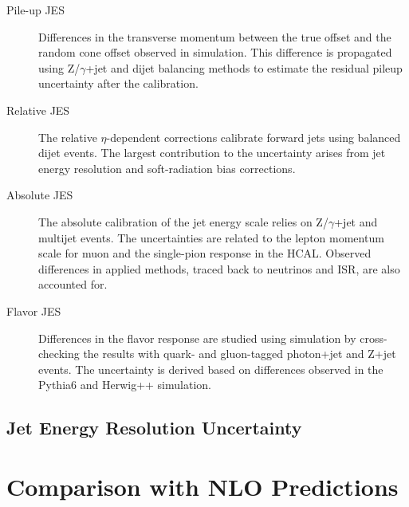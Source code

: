 \begin{description}
    \item[Pile-up JES] Differences in the transverse momentum between the true
        offset and the random cone offset observed in simulation. This
        difference is propagated using Z/$\gamma$+jet and dijet balancing
        methods to estimate the residual pileup uncertainty after the
        calibration.
    \item[Relative JES] The relative $\eta$-dependent corrections calibrate
        forward jets using balanced dijet events. The largest contribution to
        the uncertainty arises from jet energy resolution and soft-radiation
        bias corrections. 
    \item[Absolute JES]  The absolute calibration of the jet energy scale relies
        on Z/$\gamma$+jet and multijet events. The uncertainties are related to
        the lepton momentum scale for muon and the single-pion response in the
        HCAL. Observed differences in applied methods, traced back to neutrinos
        and ISR, are also accounted for. 
    \item[Flavor JES] Differences in the flavor response are studied using
        simulation by cross-checking the results with quark- and gluon-tagged
        photon+jet and Z+jet events. The uncertainty is derived based on
        differences observed in the Pythia6 and Herwig++ simulation.
\end{description}

\subsection{Jet Energy Resolution Uncertainty}

\section{Comparison with NLO Predictions}

